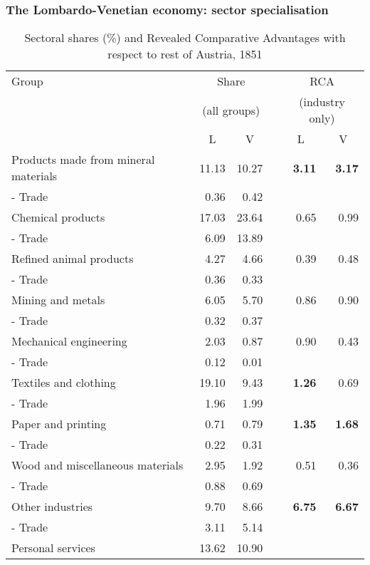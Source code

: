 \documentclass[10pt]{beamer}
\begin{document}
\begin{frame}
    \frametitle{The Lombardo-Venetian economy: sector specialisation}

\begin{table}[htbp]
  \centering
  \fontsize{8}{8}\selectfont
  \caption{Sectoral shares (\%) and Revealed Comparative Advantages with respect to rest of Austria, 1851}
    \begin{tabular}{p{5cm}rrrrr}
    \hline
    Group & \multicolumn{2}{c}{Share} &   & \multicolumn{2}{c}{RCA} \\
     & \multicolumn{2}{c}{(all groups)} &   & \multicolumn{2}{c}{(industry only)} \\
\cline{2-3}\cline{5-6}      & \multicolumn{1}{c}{L} & \multicolumn{1}{c}{V} &   & \multicolumn{1}{c}{L} & \multicolumn{1}{c}{V}\\
    \hline
    Products made from mineral materials & 11.13 & 10.27 &   & \textbf{3.11} & \textbf{3.17} \\
    - Trade & 0.36 & 0.42 &   & \multicolumn{1}{l}{} & \multicolumn{1}{l}{} \\
    Chemical products & 17.03 & 23.64 &   & 0.65 & 0.99 \\
    - Trade & 6.09 & 13.89 &   & \multicolumn{1}{l}{} & \multicolumn{1}{l}{} \\
    Refined animal products & 4.27 & 4.66 &   & 0.39 & 0.48 \\
    - Trade & 0.36 & 0.33 &   & \multicolumn{1}{l}{} & \multicolumn{1}{l}{} \\
    Mining and metals & 6.05 & 5.70 &   & 0.86 & 0.90 \\
    - Trade & 0.32 & 0.37 &   & \multicolumn{1}{l}{} & \multicolumn{1}{l}{} \\
    Mechanical engineering & 2.03 & 0.87 &   & 0.90 & 0.43 \\
    - Trade & 0.12 & 0.01 &   & \multicolumn{1}{l}{} & \multicolumn{1}{l}{} \\
    Textiles and clothing & 19.10 & 9.43 &   & \textbf{1.26} & 0.69 \\
    - Trade & 1.96 & 1.99 &   & \multicolumn{1}{l}{} & \multicolumn{1}{l}{} \\
    Paper and printing & 0.71 & 0.79 &   & \textbf{1.35} & \textbf{1.68} \\
    - Trade & 0.22 & 0.31 &   & \multicolumn{1}{l}{} & \multicolumn{1}{l}{} \\
    Wood and miscellaneous materials & 2.95 & 1.92 &   & 0.51 & 0.36 \\
    - Trade & 0.88 & 0.69 &   & \multicolumn{1}{l}{} & \multicolumn{1}{l}{} \\
    Other industries & 9.70 & 8.66 &   & \textbf{6.75} & \textbf{6.67} \\
    - Trade & 3.11 & 5.14 &   &   &  \\
    Personal services & 13.62 & 10.90 &   &   &  \\
    \hline
    \end{tabular}%
  \label{tab:rca_groups}%


\end{table}
\end{frame}
\end{document}
